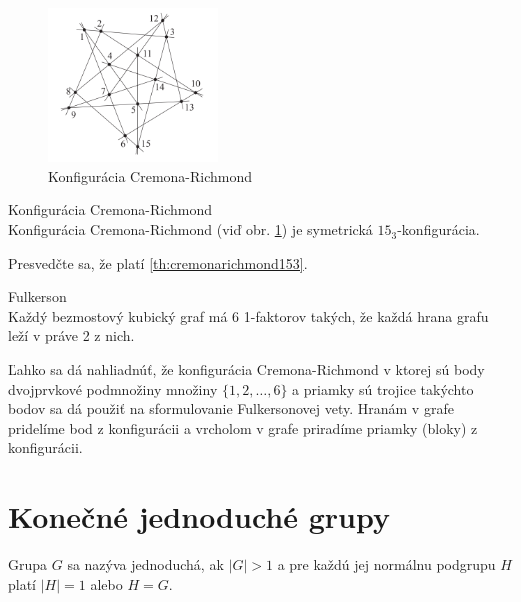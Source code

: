 \begin{figure}
	\centering
	\includegraphics[width=0.4\textwidth]{images/stellar_cremona_richmond}
	\caption{Konfigurácia Cremona-Richmond\protect\footnotemark}
	\label{img:cremonarichmondconfiguration}
\end{figure}


\begin{theorem}{Konfigurácia Cremona-Richmond}\\
	\label{th:cremonarichmond153}
	Konfigurácia Cremona-Richmond (viď obr. \ref{img:cremonarichmondconfiguration}) je symetrická $15_3$-konfigurácia. 
\end{theorem}

\begin{exercise}
	Presvedčte sa, že platí \ref{th:cremonarichmond153}.
\end{exercise}

\begin{hypothesis} {Fulkerson}\\
	Každý bezmostový kubický graf má 6 1-faktorov takých, že každá hrana grafu leží v práve 2 z nich.
\end{hypothesis}

Ľahko sa dá nahliadnúť, že konfigurácia Cremona-Richmond v ktorej sú body dvojprvkové podmnožiny množiny $\{1, 2, \dots, 6\}$ a priamky sú trojice takýchto bodov sa dá použiť na sformulovanie Fulkersonovej vety. Hranám v grafe pridelíme bod z konfigurácii a vrcholom v grafe priradíme priamky (bloky) z konfigurácii.

\section{Konečné jednoduché grupy}

\begin{definition}
	Grupa $G$ sa nazýva jednoduchá, ak $\lvert G\rvert > 1$ a pre každú jej normálnu podgrupu $H$ platí $\lvert H \rvert = 1$ alebo $H = G$.
\end{definition}

